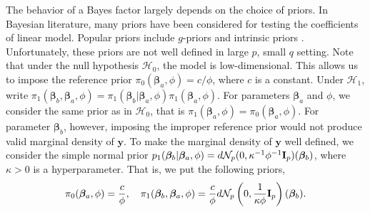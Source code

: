 \documentclass[smallextended]{svjour3}       %
\newcommand{\By}{\mathbf{y}}    \newcommand{\Bz}{\mathbf{z}}
\newcommand{\bfsym}[1]{\ensuremath{\boldsymbol{#1}}}
\def\bbeta{\bfsym \beta}
\begin{document}
The behavior of a Bayes factor largely depends on the choice of priors.
In Bayesian literature, many priors have been considered for testing the coefficients of linear model.
Popular priors include $g$-priors \citep{Liang2008Mixtures} and intrinsic priors \citep{Casella2006Obj}.
Unfortunately, these priors are not well defined in large $p$, small $q$ setting.
Note that under the null hypothesis $\mathcal H_0$, the model is low-dimensional.
This allows us to impose the reference prior $\pi_0 (\bbeta_a,\phi)=c/\phi$, where $c$ is a constant.
Under $\mathcal H_1$,
write $\pi_1(\bbeta_b,\bbeta_a,\phi)=\pi_1(\bbeta_b|\bbeta_a,\phi) \pi_1(\bbeta_a,\phi)$.
For parameters $\bbeta_a $ and $\phi$, we consider the same prior as in $\mathcal H_0$, that is $\pi_1(\bbeta_a,\phi)=\pi_0(\bbeta_a,\phi)$.
For parameter $\bbeta_b$, however, imposing the improper reference prior would not produce valid marginal density of $\By$.
To make the marginal density of $\By$ well defined,
we consider the simple normal prior $p_1(\bbeta_b|\bbeta_a, \phi) = d \mathcal N_{p} (0, \kappa^{-1} \phi^{-1} \BI_{p}) (\bbeta_b) $, where $\kappa>0$ is a hyperparameter.
That is, we put the following priors,
\begin{equation}\label{priors}
    \pi_0(\bbeta_a,\phi)= \frac{c}{\phi},\quad
    \pi_1(\bbeta_b,\bbeta_a,\phi)=\frac{c}{\phi} d \mathcal N_{p} \left(0, \frac{1}{\kappa \phi} \BI_{p}\right) (\bbeta_b).
\end{equation}
\end{document}
